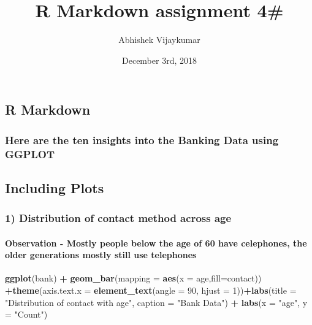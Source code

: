 \documentclass[]{article}
\title{R Markdown assignment 4\#}
\author{Abhishek Vijaykumar}
\date{December 3rd, 2018}
\newenvironment{Shaded}{\begin{snugshade}}{\end{snugshade}}
\newcommand{\KeywordTok}[1]{\textcolor[rgb]{0.13,0.29,0.53}{\textbf{#1}}}
\newcommand{\DataTypeTok}[1]{\textcolor[rgb]{0.13,0.29,0.53}{#1}}
\newcommand{\DecValTok}[1]{\textcolor[rgb]{0.00,0.00,0.81}{#1}}
\newcommand{\StringTok}[1]{\textcolor[rgb]{0.31,0.60,0.02}{#1}}
\newcommand{\OperatorTok}[1]{\textcolor[rgb]{0.81,0.36,0.00}{\textbf{#1}}}
\newcommand{\NormalTok}[1]{#1}
\let\oldparagraph\paragraph
\renewcommand{\paragraph}[1]{\oldparagraph{#1}\mbox{}}
\begin{document}
\maketitle

\subsection{R Markdown}\label{r-markdown}

\subsubsection{Here are the ten insights into the Banking Data using
GGPLOT}\label{here-are-the-ten-insights-into-the-banking-data-using-ggplot}

\subsection{Including Plots}\label{including-plots}

\subsubsection{1) Distribution of contact method across
age}\label{distribution-of-contact-method-across-age}

\paragraph{Observation - Mostly people below the age of 60 have
celephones, the older generations mostly still use
telephones}\label{observation---mostly-people-below-the-age-of-60-have-celephones-the-older-generations-mostly-still-use-telephones}

\begin{Shaded}
\begin{Highlighting}[]
\KeywordTok{ggplot}\NormalTok{(bank) }\OperatorTok{+}
\KeywordTok{geom_bar}\NormalTok{(}\DataTypeTok{mapping =} \KeywordTok{aes}\NormalTok{(}\DataTypeTok{x =}\NormalTok{ age,}\DataTypeTok{fill=}\NormalTok{contact)) }\OperatorTok{+}\KeywordTok{theme}\NormalTok{(}\DataTypeTok{axis.text.x =} \KeywordTok{element_text}\NormalTok{(}\DataTypeTok{angle =} \DecValTok{90}\NormalTok{, }\DataTypeTok{hjust =} \DecValTok{1}\NormalTok{))}\OperatorTok{+}\KeywordTok{labs}\NormalTok{(}\DataTypeTok{title =} \StringTok{"Distribution of contact with age"}\NormalTok{,}
\DataTypeTok{caption =} \StringTok{"Bank Data"}\NormalTok{) }\OperatorTok{+}
\KeywordTok{labs}\NormalTok{(}\DataTypeTok{x =} \StringTok{"age"}\NormalTok{, }\DataTypeTok{y =} \StringTok{"Count"}\NormalTok{)}
\end{Highlighting}
\end{Shaded}
\end{document}
